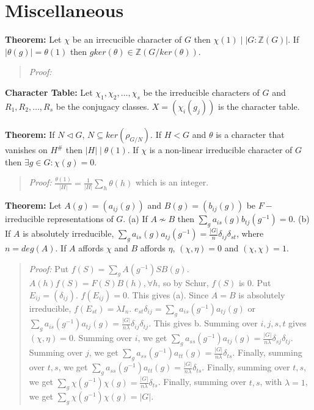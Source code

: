 {\section {Miscellaneous}
{\bf Theorem:} Let $\chi$ be an irrecucible character of $G$ then $\chi(1) \mid |G:{\mathbb Z}(G)|$.
If $|\theta(g)| = \theta(1)$ then $g ker(\theta) \in {\mathbb Z}(G/ker(\theta))$.
\begin{quote}
\emph{Proof:}
\end{quote}
{\bf Character Table:} Let $\chi_1, \chi_2, \ldots, \chi_s$ be the irreducible characters of $G$ and
$R_1 , R_2 , \ldots , R_s$ be the conjugacy classes.  $X= (\chi_i(g_j))$ is the character table.
\\
\\
{\bf Theorem:} If $N \lhd G$, $N \subseteq ker (\rho_{G/N})$.  If $H < G$ and $\theta$ is a character
that vanishes on $H^\#$ then $|H| \mid \theta(1)$. If $\chi$ is a non-linear irreducible character
of $G$ then $\exists g \in G: \chi(g)= 0$.
\begin{quote}
\emph{Proof:} ${\frac {\theta(1)} {|H|}} = {\frac 1 {|H|}} \sum_h \theta(h)$ which is an integer.
\end{quote}
{\bf Theorem:} Let $A(g)= (a_{ij}(g))$ and $B(g)= (b_{ij}(g))$ be $F-$irreducible representations of $G$.
(a) If $A \nsim B$ then $\sum_g a_{is}(g) b_{tj}(g^{-1}) = 0$.
(b) If $A$ is absolutely irreducible, $\sum_g a_{is}(g) a_{tj}(g^{-1}) = {\frac {|G|} n} \delta_{ij} \delta_{st}$,
where $n = deg(A)$.  If $A$ affords $\chi$ and $B$ affords $\eta$, $(\chi, \eta) = 0$ and
$(\chi, \chi)= 1$.
\begin{quote}
\emph{Proof:} Put $f(S) = \sum_g A(g^{-1})SB(g)$.  $A(h)f(S)=F(S)B(h), \forall h$, so by Schur, $f(S)$ is $0$.
Put $E_{ij} = (\delta_{ij})$.  $f(E_{ij}) = 0$.  This gives (a).  Since $A = B$ is absolutely irreducible,
$f(E_{st}) = \lambda I_n$.  $e_{st} \delta_{ij} = \sum_g a_{is}(g^{-1}) a_{tj}(g)$ or
$\sum_g a_{is}(g^{-1}) a_{tj}(g) = {\frac {|G|} {n \lambda}} \delta_{ij} \delta_{tj}$.  This gives b.
Summing over $i, j, s, t$ gives $(\chi, \eta) = 0$.
Summing over $i$, we get
$\sum_g a_{ss}(g^{-1}) a_{tj}(g) = {\frac {|G|} {n \lambda}} \delta_{sj} \delta_{tj}$.  Summing over $j$, we get
$\sum_g a_{ss}(g^{-1}) a_{tt}(g) = {\frac {|G|} {n \lambda}} \delta_{ts}$.  Finally, summing over $t,s$, we get
$\sum_g a_{ss}(g^{-1}) a_{tt}(g) = {\frac {|G|} {n \lambda}} \delta_{ts}$.  Finally, summing over $t,s$, we get
$\sum_g \chi(g^{-1}) \chi(g) = {\frac {|G|} {n \lambda}} \delta_{ts}$.  Finally, summing over $t,s$, with
$\lambda = 1$, we get
$\sum_g \chi(g^{-1}) \chi(g) = |G|$.
\end{quote}

}
